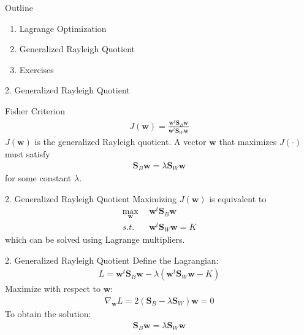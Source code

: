 \documentclass[compress,blue]{beamer}
\newcommand{\bw}{\mathbf{w}}
\newcommand{\bS}{\mathbf{S}}
\begin{document}
\begin{frame}{Outline}
	\begin{enumerate}
		\item<1-2> Lagrange Optimization
		\vspace{0.1in}
		\item<2> Generalized Rayleigh Quotient 
		\vspace{0.1in}
		\item<0> Exercises 
	\end{enumerate}
\end{frame}

\begin{frame}{2. Generalized Rayleigh Quotient }
	\begin{block}{Fisher Criterion}
		\begin{align}
			J(\bw) = \frac{\bw^t  \bS_B \bw}{\bw^t \bS_W \bw}
		\end{align}
		$J(\bw)$ is the generalized Rayleigh quotient. A vector $\bw$ that maximizes $J(\cdot)$ must satisfy 
		\begin{align}
			\bS_B\bw = \lambda\bS_W\bw
		\end{align}
		for some constant $\lambda$.
	\end{block}	
\end{frame}

\begin{frame}{2. Generalized Rayleigh Quotient}
	Maximizing $J(\bw)$ is equivalent to 
	\begin{align}
		\max_{\bw} ~~& \bw^t \bS_B \bw \\
		s.t. ~~~& \bw^t \bS_W \bw = K
	\end{align}
	which can be solved using Lagrange multipliers.
\end{frame}

\begin{frame}{2. Generalized Rayleigh Quotient}
	Define the 	Lagrangian:
	\begin{align}
		L = \bw^t\bS_B\bw - \lambda (\bw^t \bS_W \bw - K)
	\end{align} 
	Maximize with respect to $\bw$:
	\begin{align}
		\nabla_{\bw}L = 2(\bS_B - \lambda\bS_W)\bw = 0
	\end{align}
	To obtain the solution:
	\begin{align}
		\bS_B\bw = \lambda \bS_W\bw
	\end{align}
\end{frame}
\end{document}
